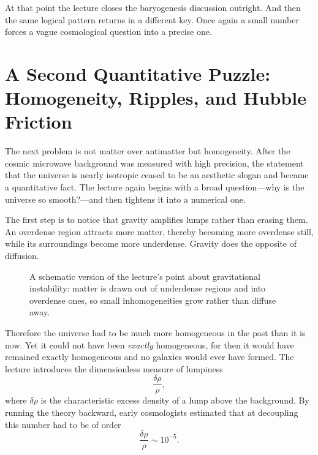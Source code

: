 At that point the lecture closes the baryogenesis discussion outright. And then the same logical pattern returns in a different key. Once again a small number forces a vague cosmological question into a precise one.

\section{A Second Quantitative Puzzle: Homogeneity, Ripples, and Hubble Friction}

The next problem is not matter over antimatter but homogeneity.
After the cosmic microwave background was measured with high precision, the statement that the universe is nearly isotropic ceased to be an aesthetic slogan and became a quantitative fact.
The lecture again begins with a broad question---why is the universe so smooth?---and then tightens it into a numerical one.

The first step is to notice that gravity amplifies lumps rather than erasing them. An overdense region attracts more matter, thereby becoming more overdense still, while its surroundings become more underdense. Gravity does the opposite of diffusion.

\begin{figure}
\centering
{}%
\caption{A schematic version of the lecture's point about gravitational instability: matter is drawn out of underdense regions and into overdense ones, so small inhomogeneities grow rather than diffuse away.}
\end{figure}

Therefore the universe had to be much more homogeneous in the past than it is now. Yet it could not have been \emph{exactly} homogeneous, for then it would have remained exactly homogeneous and no galaxies would ever have formed. The lecture introduces the dimensionless measure of lumpiness
\begin{equation}
\frac{\delta \rho}{\rho},
\end{equation}
where \(\delta\rho\) is the characteristic excess density of a lump above the background. By running the theory backward, early cosmologists estimated that at decoupling this number had to be of order
\begin{equation}
\frac{\delta \rho}{\rho}\sim 10^{-5}.
\end{equation}


